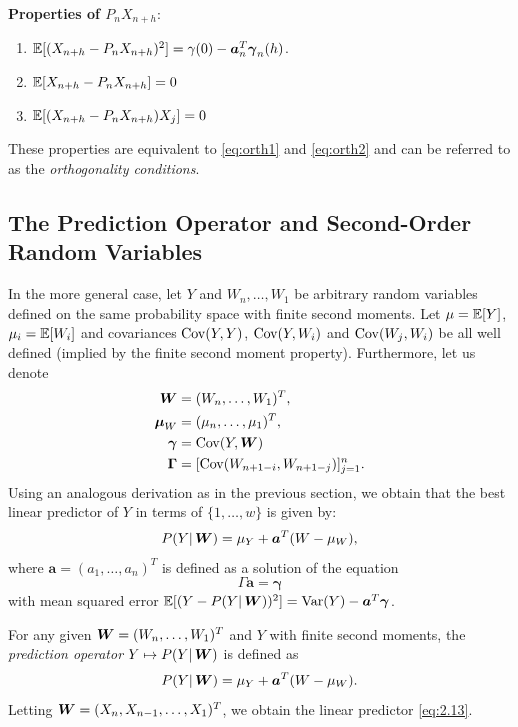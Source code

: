 \documentclass[a4paper, oneside]{discothesis}
\begin{document}
\textbf{Properties of $P_nX_{n+h}$}:
\begin{enumerate}
    \item $\operatorname{\mathbb{E}}[(X_{n+h} - P_n X_{n+h})^2] = \gamma(0) - \boldsymbol{a}_n^T \boldsymbol{\gamma}_n(h)$.
    \item $\operatorname{\mathbb{E}}[X_{n+h} - P_n X_{n+h}] = 0$
    \item $\operatorname{\mathbb{E}}[(X_{n+h} - P_n X_{n+h})X_j] = 0$
\end{enumerate}

These properties are equivalent to \eqref{eq:orth1} and \eqref{eq:orth2} and can be referred to as the \textit{orthogonality conditions}.

\subsection{The Prediction Operator and Second-Order Random Variables}
In the more general case, let  $Y$ and $W_n, \dots, W_1$ be arbitrary random variables defined on the same probability space with finite second moments. Let $\mu = \operatorname{\mathbb{E}}[Y]$, $\mu_i = \operatorname{\mathbb{E}}[W_i]$ and covariances $\operatorname{\mathrm{Cov}}(Y,Y)$, $\operatorname{\mathrm{Cov}}(Y,W_i)$ and $\operatorname{\mathrm{Cov}}(W_j,W_i)$ be all well defined (implied by the finite second moment property). Furthermore, let us denote
\begin{align*}
    \operatorname{\boldsymbol{W}} &= (W_n, \dots, W_1)^T, \\
    \boldsymbol{\mu}_W &= (\mu_n, \dots, \mu_1)^T, \\
    \boldsymbol{\gamma} &= \operatorname{\mathrm{Cov}}(Y,\operatorname{\boldsymbol{W}}) \\
    \boldsymbol{\Gamma} &= [\operatorname{\mathrm{Cov}}(W_{n+1-i}, W_{n+1-j})]^n_{j=1}.
\end{align*}
Using an analogous derivation as in the previous section, we obtain that the best linear predictor of $Y$ in terms of $\{1, \dots, w\}$ is given by:
\begin{equation*}
    P(Y | \operatorname{\boldsymbol{W}}) = \mu_Y + \boldsymbol{a}^T(W-\mu_W),
\end{equation*}
where $\boldsymbol{a} = (a_1, \dots, a_n)^T$ is defined as a solution of the equation
\begin{equation*}
    \Gamma \boldsymbol{a} = \boldsymbol{\gamma}
\end{equation*}
with mean squared error $\operatorname{\mathbb{E}}[(Y-P(Y|\operatorname{\boldsymbol{W}}))^2] = \mathrm{Var}(Y) - \boldsymbol{a}^T\boldsymbol{\gamma}$.

\begin{definition}
    For any given $\operatorname{\boldsymbol{W}} = (W_n, \dots, W_1)^T$ and $Y$ with finite second moments, the \textit{prediction operator} $Y \mapsto P(Y|\operatorname{\boldsymbol{W}})$ is defined as
    \begin{equation}
        P(Y | \operatorname{\boldsymbol{W}}) = \mu_Y + \boldsymbol{a}^T(W-\mu_W).
    \end{equation}
    Letting $\operatorname{\boldsymbol{W}} = (X_n, X_{n-1}, \dots, X_1)^T$, we obtain the linear predictor \eqref{eq:2.13}.
\end{definition}
\end{document}
